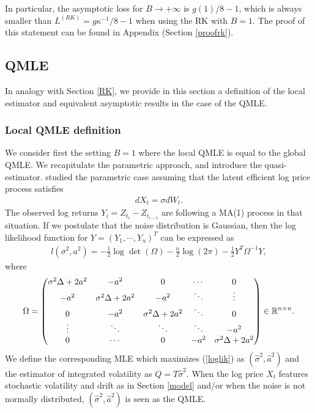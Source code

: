 \documentclass[11pt]{article}
\numberwithin{equation}{section}
\theoremstyle{plain}
\theoremstyle{remark}
\begin{document}
\begin{remark} \label{rklossprop}
In particular, the asymptotic loss for $B \to +\infty$ is $g(1)/8-1$, which is always smaller than $L^{(RK)} = g \kappa^{-1}/8-1$ when using the RK with $B=1$. The proof of this statement can be found in Appendix (Section \ref{proofrk}).
\end{remark}

\subsection{QMLE}
\label{QMLE}
In analogy with Section \ref{RK}, we provide in this section a definition of the local estimator and equivalent asymptotic results in the case of the QMLE.

\subsubsection{Local QMLE definition}
\label{localQMLEsub}
We consider first the setting $B=1$ where the local QMLE is equal to the global QMLE. We recapitulate the parametric approach, and introduce the quasi-estimator. \cite{ait2005often} studied the parametric case assuming that the latent efficient log price process satisfies 
\begin{eqnarray}
\label{param}
dX_t = \sigma dW_t.
\end{eqnarray}
The observed log returns $Y_i = Z_{t_i} - Z_{t_{i-1}}$ are following a MA(1) process in that situation. If we postulate that the noise distribution is Gaussian, then the log likelihood function for $Y = (Y_1, \cdots, Y_n)^T$ can be expressed as
\begin{eqnarray}
\label{loglik}
l(\sigma^2, a^2) = - \frac{1}{2} \log \det(\Omega) - \frac{n}{2} \log (2\pi) -\frac{1}{2} Y^T \Omega^{-1} Y,
\end{eqnarray}
where 
$$\Omega = \left(\begin{matrix}
                    \sigma^2 \Delta + 2 a^2 & - a^2 & 0 & \cdots & 0 \\
                    - a^2 & \sigma^2 \Delta + 2 a^2 & - a^2 & \ddots & \vdots \\
                    0 & - a^2 & \sigma^2 \Delta + 2 a^2 & \ddots & 0\\
                    \vdots & \ddots & \ddots & \ddots & - a^2\\
                    0 & \cdots & 0 & - a^2 & \sigma^2 \Delta + 2 a^2
                  \end{matrix}\right) \in \mathbb{R}^{n\times n}.\\[12pt] $$
We define the corresponding MLE which maximizes (\ref{loglik}) as $(\widehat{\sigma}^2, \widehat{a}^2)$ and the estimator of integrated volatility as $Q = T \widehat{\sigma}^2$. When the log price $X_t$ features stochastic volatility and drift as in Section \ref{model} and/or when the noise is not normally distributed, $(\widehat{\sigma}^2, \widehat{a}^2)$ is seen as the QMLE. 
\end{document}
